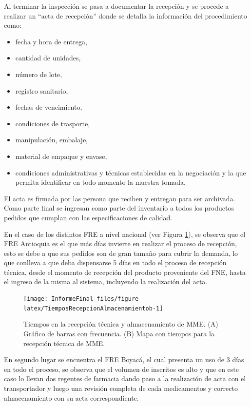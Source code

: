 \documentclass[
]{book}
\begin{document}
Al terminar la inspección se pasa a documentar la recepción y se procede a realizar un ``acta de recepción'' donde se detalla la información del procedimiento como:

\begin{itemize}
\item
  fecha y hora de entrega,
\item
  cantidad de unidades,
\item
  número de lote,
\item
  registro sanitario,
\item
  fechas de vencimiento,
\item
  condiciones de trasporte,
\item
  manipulación, embalaje,
\item
  material de empaque y envase,
\item
  condiciones administrativas y técnicas establecidas en la negociación y la que permita identificar en todo momento la muestra tomada.
\end{itemize}

El acta es firmada por las persona que reciben y entregan para ser archivada. Como parte final se ingresan como parte del inventario a todos los productos pedidos que cumplan con las especificaciones de calidad.

En el caso de los distintos FRE a nivel nacional (ver Figura \ref{fig:TiemposRecepcionAlmacenamientob}), se observa que el FRE Antioquia es el que más días invierte en realizar el proceso de recepción, esto se debe a que sus pedidos son de gran tamaño para cubrir la demanda, lo que conlleva a que deba dispensarse 5 días en todo el proceso de recepción técnica, desde el momento de recepción del producto proveniente del FNE, hasta el ingreso de la misma al sistema, incluyendo la realización del acta.

\begin{figure}
\texttt{[image: InformeFinal\_files/figure-latex/TiemposRecepcionAlmacenamientob-1]} \caption{Tiempos en la recepción técnica y almacenamiento de MME. (A) Gráfico de barras con frecuencia. (B) Mapa con tiempos para la recepción técnica de MME.}\label{fig:TiemposRecepcionAlmacenamientob}
\end{figure}

En segundo lugar se encuentra el FRE Boyacá, el cual presenta un uso de 3 días en todo el proceso, se observa que el volumen de inscritos es alto y que en este caso lo llevan dos regentes de farmacia dando paso a la realización de acta con el transportador y luego una revisión completa de cada medicamentos y correcto almacenamiento con su acta correspondiente.
\end{document}
